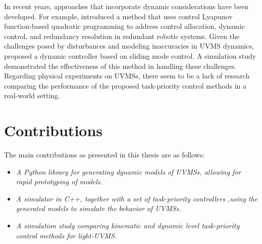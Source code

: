 In recent years, approaches that incorporate dynamic considerations have been 
developed. For example, \cite{basso2020} introduced a method that uses control 
Lyapunov function-based quadratic programming to address control allocation, 
dynamic control, and redundancy resolution in redundant robotic systems. Given 
the challenges posed by disturbances and modeling inaccuracies in UVMS 
dynamics, \cite{iversflaten2022} proposed a dynamic controller based on sliding 
mode control. A simulation study demonstrated the effectiveness of this method 
in handling these challenges. Regarding physical experiments on UVMSs, there 
seem to be a lack of research comparing the performance of the proposed 
task-priority control methods in a real-world setting.




\iffalse
\section{Assumptions}
\begin{enumerate}
    \item \emph{The UVMS position and attidude, as well as their derivatives, are
        known exactly at all times.}
    \item \emph{Assumption 2}
    \item \emph{Assumption 3}
\end{enumerate}
\fi

\section{Contributions}

The main contributions as presented in this thesis are as follows:
\begin{itemize}
    \item \emph{A Python library for generating dynamic models of UVMSs, allowing
        for rapid prototyping of models.}
    \item \emph{A simulator in C++, together with a set of task-priority controllers
        ,using the generated models to simulate the behavior of UVMSs.}
    \item \emph{A simulation study comparing kinematic and dynamic level
        task-priority control methods for light-UVMS.}
\end{itemize}


